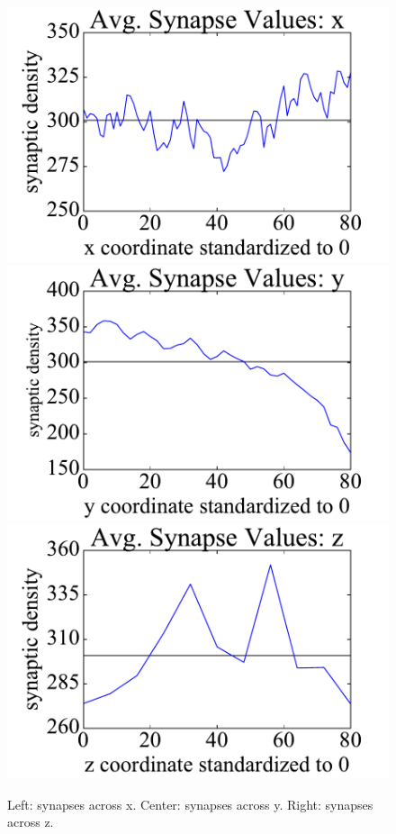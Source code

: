 \documentclass{article}
\begin{document}
\begin{figure}[h]
  \centering
  \includegraphics[scale = .3]{Fig2a}
  \includegraphics[scale = .3]{Fig2b}
  \includegraphics[scale = .3]{Fig2c}
  \caption{Left: synapses across x. Center: synapses across y. Right: synapses across z.}
\end{figure}
\end{document}

